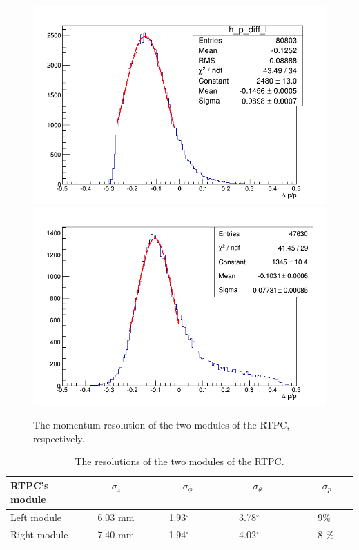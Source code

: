 \begin{figure}[tbp]
\includegraphics[scale=0.31]{fig_rtpc/fit_delta_p_l.png}
\includegraphics[scale=0.31]{fig_rtpc/fit_delta_p_r.png}
\caption{The momentum resolution of the two modules of the RTPC, respectively.}
\label{fig:rtpc_resolution_p}
\end{figure}
 
\begin{table}[tbp]
\begin{center}
\begin{tabular}{|l|l|l|l|l|}
\hline
RTPC's module & ~~~~~~$\sigma_{z}$ ~~~~~~&  ~~~~~~$\sigma_{\phi}$~~~~~~ & ~~~~~~$\sigma_{\theta}$~~~~~~ & ~~~~~~$\sigma_{p}$~~~~~~\\
\hline
Left module &  ~~~~6.03 mm & ~~~~1.93$^{\circ}$ & ~~~~3.78$^{\circ}$ & ~~~~~~9$\%$ \\
\hline
Right module & ~~~~7.40 mm & ~~~~1.94$^{\circ}$ & ~~~~4.02$^{\circ}$  & ~~~~~~8 $\%$\\
\hline
\end{tabular}
\caption{The resolutions of the two modules of the RTPC.}
\label{table:rtpc_resolutions}
\end{center}
\end{table}

